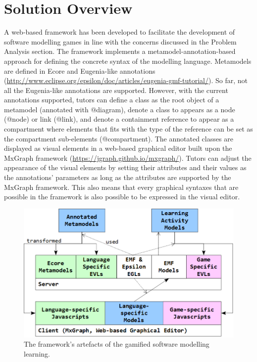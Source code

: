 \documentclass[conference]{IEEEtran}
\begin{document}
\section{Solution Overview}
\label{Solution Overview}
A web-based framework has been developed to facilitate the development of software modelling games in line with the concerns discussed in the Problem Analysis section. The framework implements a metamodel-annotation-based approach for defining the concrete syntax of the modelling language. Metamodels are defined in Ecore \cite{steinberg2008emf} and Eugenia-like annotations \cite{kolovos2015eugenia}(\url{http://www.eclipse.org/epsilon/doc/articles/eugenia-gmf-tutorial/}). So far, not all the Eugenia-like annotations are supported. However, with the current annotations supported, tutors can define a class as the root object of a metamodel (annotated with {\selectfont @diagram}), denote a class to appears as a node ({\selectfont @node}) or link ({\selectfont @link}), and denote a containment reference to appear as a compartment where elements that fits with the type of the reference can be set as the compartment sub-elements ({\selectfont @compartment}). The annotated classes are displayed as visual elements in a web-based graphical editor built upon the MxGraph framework (\url{https://jgraph.github.io/mxgraph/}). Tutors can adjust the appearance of the visual elements by setting their attributes and their values as the annotations' parameters as long as the attributes are supported by the MxGraph framework. This also means that every graphical syntaxes that are possible in the framework is also possible to be expressed in the visual editor.   

\begin{figure}[!t]
\centering
\includegraphics[width=\linewidth]{artefacts}
\caption{The framework's artefacts of the gamified software modelling learning.}
\label{artefacts}
\end{figure}
\end{document}
